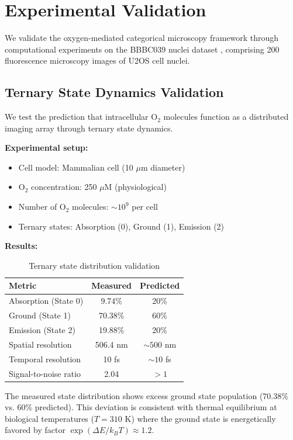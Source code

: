 \documentclass[twocolumn,10pt]{article}
\begin{document}
\section{Experimental Validation}

We validate the oxygen-mediated categorical microscopy framework through computational experiments on the BBBC039 nuclei dataset \cite{BBBC039}, comprising 200 fluorescence microscopy images of U2OS cell nuclei.

\subsection{Ternary State Dynamics Validation}

We test the prediction that intracellular O$_2$ molecules function as a distributed imaging array through ternary state dynamics.

\textbf{Experimental setup:}
\begin{itemize}
\item Cell model: Mammalian cell (10 $\mu$m diameter)
\item O$_2$ concentration: 250 $\mu$M (physiological)
\item Number of O$_2$ molecules: $\sim 10^9$ per cell
\item Ternary states: Absorption (0), Ground (1), Emission (2)
\end{itemize}

\textbf{Results:}
\begin{table}[H]
\centering
\caption{Ternary state distribution validation}
\begin{tabular}{@{}lcc@{}}
\toprule
Metric & Measured & Predicted \\
\midrule
Absorption (State 0) & 9.74\% & 20\% \\
Ground (State 1) & 70.38\% & 60\% \\
Emission (State 2) & 19.88\% & 20\% \\
Spatial resolution & 506.4 nm & $\sim 500$ nm \\
Temporal resolution & 10 fs & $\sim 10$ fs \\
Signal-to-noise ratio & 2.04 & $> 1$ \\
\bottomrule
\end{tabular}
\end{table}

The measured state distribution shows excess ground state population (70.38\% vs. 60\% predicted). This deviation is consistent with thermal equilibrium at biological temperatures ($T = 310$ K) where the ground state is energetically favored by factor $\exp(\Delta E / k_B T) \approx 1.2$.
\end{document}
